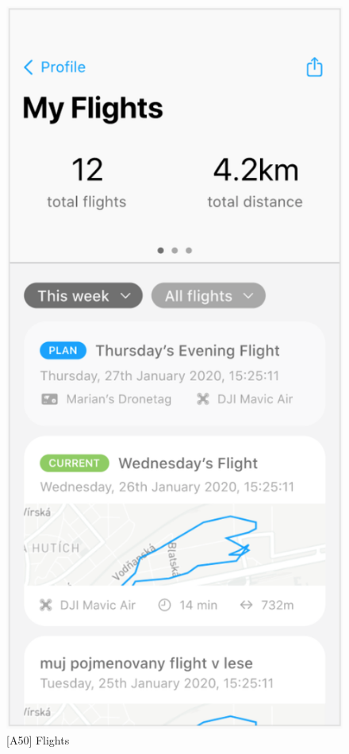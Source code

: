 \begin{figure}
\begin{minipage}{.45\textwidth}
        \includegraphics[width=.7\linewidth]{assets/user_interface_design/flight/flights.png}
        \caption{[A50] Flights}
        \label{fig:flights}
    \end{minipage}%
    \label{fig:flight_all}
\end{figure}
